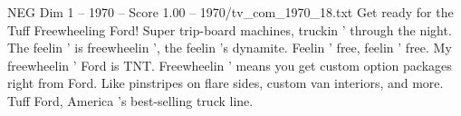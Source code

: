 \begin{textsample}{NEG Dim 1 – 1970 – Score 1.00 – 1970/tv\_com\_1970\_18.txt}  \label{ex:f1_neg_070}
Get ready for the Tuff Freewheeling Ford!
Super trip-board machines, truckin ' through the night.
The feelin ' is freewheelin ', the feelin 's dynamite.
Feelin ' free, feelin ' free.
My freewheelin ' Ford is TNT.
Freewheelin ' means you get custom option packages right from Ford.
Like pinstripes on flare sides, custom van interiors, and more.
Tuff Ford, America 's best-selling truck line.

\end{textsample}
